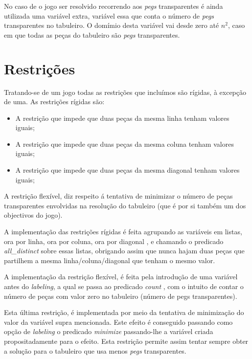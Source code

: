 \documentclass{llncs}
\begin{document}
No caso de o jogo ser resolvido recorrendo aos \emph{pegs} transparentes \'{e} ainda utilizada uma vari\'{a}vel extra, vari\'{a}vel essa que conta o n\'{u}mero de \emph{pegs} transparentes no tabuleiro. O dom\'{i}mio desta vari\'{a}vel vai desde zero at\'{e} $n^2$, caso em que todas as pe\c{c}as do tabuleiro s\~{a}o \emph{pegs} transparentes.

\section{Restri\c{c}\~{o}es}

Tratando-se de um jogo todas as restri\c{c}\~{o}es que inclu\'{i}mos s\~{a}o r\'{i}gidas, \`{a} excep\c{c}\~{a}o de uma.
As restri\c{c}\~{o}es r\'{i}gidas s\~{a}o:

\begin{itemize}
\item A restri\c{c}\~{a}o que impede que duas pe\c{c}as da mesma linha tenham valores iguais;
\item A restri\c{c}\~{a}o que impede que duas pe\c{c}as da mesma coluna tenham valores iguais;
\item A restri\c{c}\~{a}o que impede que duas pe\c{c}as da mesma diagonal tenham valores iguais;
\end{itemize}

A restri\c{c}\~{a}o flex\'{i}vel, diz respeito \'{a} tentativa de minimizar o n\'{u}mero de pe\c{c}as transparentes envolvidas na resolu\c{c}\~{a}o do tabuleiro (que \'{e} por si tamb\'{e}m um dos objectivos do jogo).

A implementa\c{c}\~{a}o das restri\c{c}\~{o}es r\'{i}gidas \'{e} feita agrupando as vari\'{a}veis em listas, ora por linha, ora por coluna, ora por diagonal , e chamando o predicado \emph{all\_distinct} sobre essas listas, obrigando assim que nunca hajam duas pe\c{c}as que partilhem a mesma linha/coluna/diagonal que tenham o mesmo valor.

A implementa\c{c}\~{a}o da restri\c{c}\~{a}o flex\'{i}vel, \'{e} feita pela introdu\c{c}\~{a}o de uma vari\'{a}vel antes do \emph{labeling}, a qual se passa ao predicado \emph{count} , com o intuito de contar o n\'{u}mero de pe\c{c}as com valor zero no tabuleiro (n\'{u}mero de pegs transparentes).

Esta \'{u}ltima restri\c{c}\~{a}o, \'{e} implementada por meio da tentativa de minimiza\c{c}\~{a}o do valor da vari\'{a}vel supra mencionada. Este efeito \'{e} conseguido passando como op\c{c}\~{a}o de \emph{labeling} o predicado \emph{minimize} passando-lhe a vari\'{a}vel criada propositadamente para o efeito. Esta restri\c{c}\~{a}o permite assim tentar sempre obter a solu\c{c}\~{a}o para o tabuleiro que usa menos \emph{pegs} transparentes.  
\end{document}
